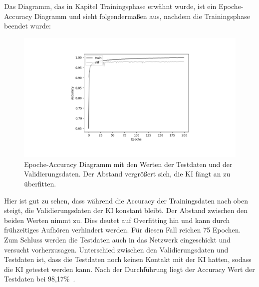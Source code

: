 \documentclass[11pt]{article}
\begin{document}
Das Diagramm, das in Kapitel Trainingsphase erwähnt wurde, ist ein Epoche-Accuracy Diagramm und sieht folgendermaßen aus, nachdem die Trainingsphase
beendet wurde:
\begin{figure}[h]
    \centering
    \includegraphics[width=340pt, keepaspectratio]{images/accuracydiagram}
    \caption[Epoche-Accuracy Diagramm]{Epoche-Accuracy Diagramm mit den Werten der Testdaten und der Validierungsdaten. Der Abstand vergrößert sich,
    die KI fängt an zu überfitten.}
\end{figure}
Hier ist gut zu sehen, dass während die Accuracy der Trainingsdaten nach oben steigt, die Validierungsdaten der KI konstant bleibt. Der Abstand zwischen den
beiden Werten nimmt zu. Dies deutet auf Overfitting hin und kann durch frühzeitiges Aufhören verhindert werden. Für diesen Fall reichen
75 Epochen. Zum Schluss werden die Testdaten auch in das Netzwerk eingeschickt und versucht vorherzusagen. Unterschied zwischen den Validierungsdaten
und Testdaten ist, dass die Testdaten noch keinen Kontakt mit der KI hatten, sodass die KI getestet werden kann.
Nach der Durchführung liegt der Accuracy Wert der Testdaten bei 98,17\%~\cite{9}.
\end{document}
